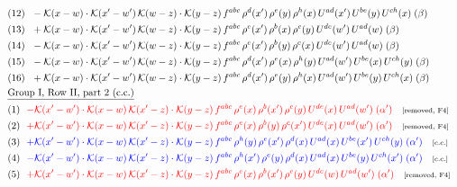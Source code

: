 \documentclass[9pt]{article}
\begin{document}
\begin{align}
&\quad\text{(12)}\ \ - \mathcal{K}(x-w) \cdot \mathcal{K}(x'-w')\, \mathcal{K}(w-z)\cdot \mathcal{K}(y-z)\, f^{abc}\, \rho^{d}(x')\,\rho^{e}(y)\,\rho^{h}(x)\,U^{ad}(x')\,U^{be}(y)\,U^{ch}(x)\;(\beta)\notag\\
&\quad\text{(13)}\ \ + \mathcal{K}(x-w) \cdot \mathcal{K}(x'-w')\, \mathcal{K}(w-z)\cdot \mathcal{K}(y-z)\, f^{abc}\, \rho^{e}(x')\,\rho^{b}(x)\,\rho^{c}(y)\,U^{de}(w')\,U^{ad}(w)\;(\beta)\notag\\
&\quad\text{(14)}\ \ - \mathcal{K}(x-w) \cdot \mathcal{K}(x'-w')\, \mathcal{K}(w-z)\cdot \mathcal{K}(y-z)\, f^{abc}\, \rho^{e}(x')\,\rho^{b}(y)\,\rho^{c}(x)\,U^{de}(w')\,U^{ad}(w)\;(\beta)\notag\\
&\quad\text{(15)}\ \ - \mathcal{K}(x-w) \cdot \mathcal{K}(x'-w')\, \mathcal{K}(w-z)\cdot \mathcal{K}(y-z)\, f^{abc}\, \rho^{d}(x')\,\rho^{e}(x)\,\rho^{h}(y)\,U^{ad}(w')\,U^{be}(x)\,U^{ch}(y)\;(\beta)\notag\\
&\quad\text{(16)}\ \ + \mathcal{K}(x-w) \cdot \mathcal{K}(x'-w')\, \mathcal{K}(w-z)\cdot \mathcal{K}(y-z)\, f^{abc}\, \rho^{d}(x')\,\rho^{e}(y)\,\rho^{h}(x)\,U^{ad}(w')\,U^{be}(y)\,U^{ch}(x)\;(\beta)\notag\\
&\quad\underline{\text{Group I, Row II, part 2 (c.c.)}}\notag\\
&\quad\text{(1)}\ \ \textcolor{red}{- \mathcal{K}(x'-w')\cdot \mathcal{K}(x-w)\,\mathcal{K}(x'-z) \cdot \mathcal{K}(y-z)\, f^{abc}\,\rho^{e}(x)\,\rho^{b}(x')\,\rho^{c}(y)\,U^{de}(x)\,U^{ad}(w')\;(\alpha')}\quad\text{\scriptsize[removed, F4]}\notag\\
&\quad\text{(2)}\ \ \textcolor{red}{+\mathcal{K}(x'-w')\cdot \mathcal{K}(x-w)\,\mathcal{K}(x'-z) \cdot \mathcal{K}(y-z)\, f^{abc}\,\rho^{e}(x)\,\rho^{b}(y)\,\rho^{c}(x')\,U^{de}(x)\,U^{ad}(w')\;(\alpha')}\quad\text{\scriptsize[removed, F4]}\notag\\
&\quad\text{(3)}\ \ \textcolor{blue}{+\mathcal{K}(x'-w')\cdot\mathcal{K}(x-w)\,\mathcal{K}(x'-z)\cdot\mathcal{K}(y-z)\, f^{abc}\,\rho^{h}(y)\,\rho^{e}(x')\,\rho^{d}(x)\,U^{ad}(x)\,U^{be}(x')\,U^{ch}(y)\;(\alpha')}\quad\text{\scriptsize[c.c.]}\notag\\
&\quad\text{(4)}\ \ \textcolor{blue}{-\mathcal{K}(x'-w')\cdot\mathcal{K}(x-w)\,\mathcal{K}(x'-z)\cdot\mathcal{K}(y-z)\, f^{abc}\,\rho^{h}(x')\,\rho^{e}(y)\,\rho^{d}(x)\,U^{ad}(x)\,U^{be}(y)\,U^{ch}(x')\;(\alpha')}\quad\text{\scriptsize[c.c.]}\notag\\
&\quad\text{(5)}\ \ \textcolor{red}{+ \mathcal{K}(x'-w')\cdot \mathcal{K}(x-w)\,\mathcal{K}(x'-z) \cdot \mathcal{K}(y-z)\, f^{abc}\,\rho^{e}(x)\,\rho^{b}(x')\,\rho^{c}(y)\,U^{de}(w)\,U^{ad}(w')\;(\alpha')}\quad\text{\scriptsize[removed, F4]}\notag\\

\end{align}
\end{document}
